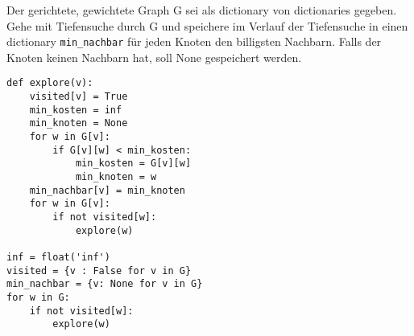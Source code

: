 ﻿\question[8]
Der gerichtete, gewichtete Graph G sei als dictionary von
dictionaries gegeben. Gehe mit Tiefensuche durch G und
speichere im Verlauf der Tiefensuche in einen dictionary \texttt{min\_nachbar} für jeden
Knoten den billigsten Nachbarn. Falls der Knoten keinen Nachbarn hat,
soll None gespeichert werden.

\begin{solutionbox}{13cm}
\begin{lstlisting}
def explore(v):
    visited[v] = True
    min_kosten = inf
    min_knoten = None
    for w in G[v]:
        if G[v][w] < min_kosten:
            min_kosten = G[v][w]
            min_knoten = w
    min_nachbar[v] = min_knoten
    for w in G[v]:
        if not visited[w]:
            explore(w)

inf = float('inf')
visited = {v : False for v in G}
min_nachbar = {v: None for v in G}
for w in G:
    if not visited[w]:
        explore(w)

\end{lstlisting}
\end{solutionbox}

